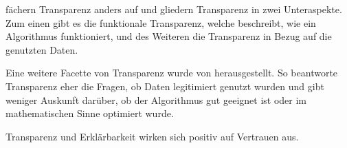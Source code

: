 \cite{huvc2021anomaly} fächern Transparenz anders auf und gliedern Transparenz in zwei Unteraspekte. Zum einen gibt es die funktionale Transparenz, welche beschreibt, wie ein Algorithmus funktioniert, und des Weiteren die Transparenz in Bezug auf die genutzten Daten.

Eine weitere Facette von Transparenz wurde von \cite{shin2020algorithm} herausgestellt. So beantworte Transparenz eher die Fragen, ob Daten legitimiert genutzt wurden und gibt weniger Auskunft darüber, ob der Algorithmus gut geeignet ist oder im mathematischen Sinne optimiert wurde.

\cite{siau2018building}Transparenz und Erklärbarkeit wirken sich positiv auf Vertrauen aus. 